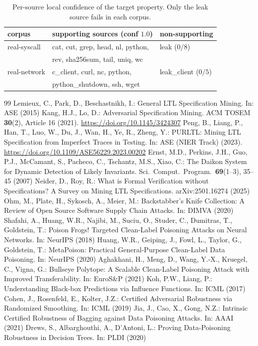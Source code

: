 \documentclass[runningheads]{llncs}
\begin{document}
\begin{table}[h]
\centering\caption{Per-source local confidence of the target property. Only the leak source fails in each corpus.}\label{tab:persource}
\begin{tabular}{lll}
\toprule
corpus & supporting sources (conf $1.0$) & non-supporting\\
\midrule
real-syscall & cat, cut, grep, head, nl, python, & leak ($0/8$)\\
 & rev, sha256sum, tail, uniq, wc & \\
real-network & c\_client, curl, nc, python, & leak\_client ($0/5$)\\
 & python\_shutdown, ssh, wget & \\
\bottomrule
\end{tabular}
\end{table}

\begin{thebibliography}{99}
 Lemieux, C., Park, D., Beschastnikh, I.: General LTL Specification Mining. In: ASE (2015)
 Kang, H.J., Lo, D.: Adversarial Specification Mining. ACM TOSEM \textbf{30}(2), Article 16 (2021). \url{https://doi.org/10.1145/3424307}
 Peng, B., Liang, P., Han, T., Luo, W., Du, J., Wan, H., Ye, R., Zheng, Y.: PURLTL: Mining LTL Specification from Imperfect Traces in Testing. In: ASE (NIER Track) (2023). \url{https://doi.org/10.1109/ASE56229.2023.00202}
 Ernst, M.D., Perkins, J.H., Guo, P.J., McCamant, S., Pacheco, C., Tschantz, M.S., Xiao, C.: The Daikon System for Dynamic Detection of Likely Invariants. Sci.\ Comput.\ Program.\ \textbf{69}(1--3), 35--45 (2007)
 Neider, D., Roy, R.: What is Formal Verification without Specifications? A Survey on Mining LTL Specifications. arXiv:2501.16274 (2025)
 Ohm, M., Plate, H., Sykosch, A., Meier, M.: Backstabber's Knife Collection: A Review of Open Source Software Supply Chain Attacks. In: DIMVA (2020)
 Shafahi, A., Huang, W.R., Najibi, M., Suciu, O., Studer, C., Dumitras, T., Goldstein, T.: Poison Frogs! Targeted Clean-Label Poisoning Attacks on Neural Networks. In: NeurIPS (2018)
 Huang, W.R., Geiping, J., Fowl, L., Taylor, G., Goldstein, T.: MetaPoison: Practical General-Purpose Clean-Label Data Poisoning. In: NeurIPS (2020)
 Aghakhani, H., Meng, D., Wang, Y.-X., Kruegel, C., Vigna, G.: Bullseye Polytope: A Scalable Clean-Label Poisoning Attack with Improved Transferability. In: EuroS\&P (2021)
 Koh, P.W., Liang, P.: Understanding Black-box Predictions via Influence Functions. In: ICML (2017)
 Cohen, J., Rosenfeld, E., Kolter, J.Z.: Certified Adversarial Robustness via Randomized Smoothing. In: ICML (2019)
 Jia, J., Cao, X., Gong, N.Z.: Intrinsic Certified Robustness of Bagging against Data Poisoning Attacks. In: AAAI (2021)
 Drews, S., Albarghouthi, A., D'Antoni, L.: Proving Data-Poisoning Robustness in Decision Trees. In: PLDI (2020)
\end{thebibliography}
\end{document}
